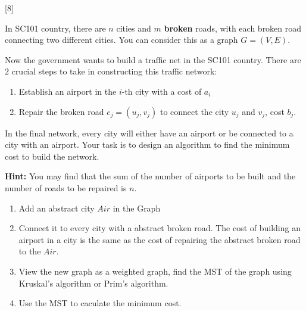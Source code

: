 [8]

In SC101 country, there are $n$ cities and $m$ \textbf{broken} roads, with each broken road connecting two different cities. You can consider this as a graph $G=(V, E)$.

Now the government wants to build a traffic net in the SC101 country. There are $2$ crucial steps to take in constructing this traffic network:
\begin{enumerate}
    \item Establish an airport in the $i$-th city with a cost of $a_i$
    \item Repair the broken road $e_j = (u_j, v_j)$ to connect the city $u_j$ and $v_j$, cost $b_j$.
\end{enumerate}
In the final network, every city will either have an airport or be connected to a city with an airport. Your task is to design an algorithm to find the minimum cost to build the network.

\textbf{Hint:} You may find that the sum of the number of airports to be built and the number of roads to be repaired is $n$.

\begin{solution}
    \begin{enumerate}
        \item Add an abstract city $Air$ in the Graph
        \item Connect it to every city with a abstract broken road. The cost of building an airport in a city is the same as the cost of repairing the abstract broken road to the $Air$.
        \item View the new graph as a weighted graph, find the MST of the graph using Kruskal's algorithm or Prim's algorithm.
        \item Use the MST to caculate the minimum cost.
    \end{enumerate}
\end{solution}
